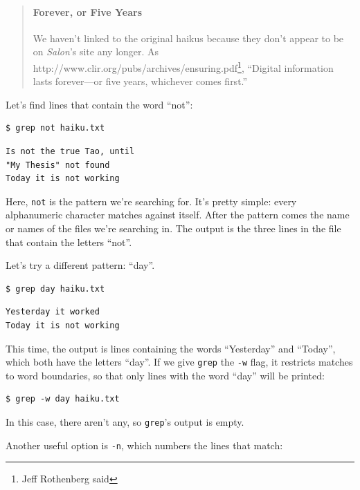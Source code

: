 \documentclass[]{book}
\newcommand{\urlfoot}[2]{{#1}\footnote{#2}}
\begin{document}
\begin{quote}
\mbox{}\paragraph{Forever, or Five Years}

We haven't linked to the original haikus because they don't appear to be
on \emph{Salon}'s site any longer. As
\urlfoot{http://www.clir.org/pubs/archives/ensuring.pdf}{Jeff Rothenberg
said}, ``Digital information lasts forever---or five years, whichever
comes first.''
\end{quote}

Let's find lines that contain the word ``not'':

\begin{verbatim}
$ grep not haiku.txt
\end{verbatim}

\begin{verbatim}
Is not the true Tao, until
"My Thesis" not found
Today it is not working
\end{verbatim}

Here, \texttt{not} is the pattern we're searching for. It's pretty
simple: every alphanumeric character matches against itself. After the
pattern comes the name or names of the files we're searching in. The
output is the three lines in the file that contain the letters ``not''.

Let's try a different pattern: ``day''.

\begin{verbatim}
$ grep day haiku.txt
\end{verbatim}

\begin{verbatim}
Yesterday it worked
Today it is not working
\end{verbatim}

This time, the output is lines containing the words ``Yesterday'' and
``Today'', which both have the letters ``day''. If we give \texttt{grep}
the \texttt{-w} flag, it restricts matches to word boundaries, so that
only lines with the word ``day'' will be printed:

\begin{verbatim}
$ grep -w day haiku.txt
\end{verbatim}

In this case, there aren't any, so \texttt{grep}'s output is empty.

Another useful option is \texttt{-n}, which numbers the lines that
match:
\end{document}
